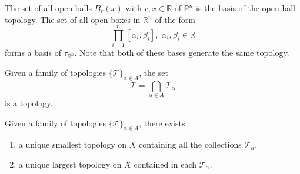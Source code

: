 \documentclass{article}
\begin{document}
      \begin{example}
        The set of all open balls $B_r (x)$ with $r, x \in \mathbb{R}$ of $\mathbb{R}^n$ is the basis of the open ball topology. The set of all open boxes in $\mathbb{R}^{n}$ of the form 
        \begin{equation}
          \prod_{i=1}^n [\alpha_i, \beta_i], \; \alpha_i, \beta_i \in \mathbb{R} 
        \end{equation}
        forms a basis of $\tau_{\mathbb{R}^{n}}$. Note that both of these bases generate the same topology. 
      \end{example} 

      \begin{theorem}
        Given a family of topologies $\{\mathscr{T}\}_{\alpha \in A}$, the set 
        \begin{equation}
          \mathscr{T} = \bigcap_{\alpha \in A} \mathscr{T}_\alpha
        \end{equation}
        is a topology. 
      \end{theorem}

      \begin{corollary}
        Given a family of topologies $\{\mathscr{T}\}_{\alpha \in A}$, there exists 
        \begin{enumerate}
          \item a unique smallest topology on $X$ containing all the collections $\mathscr{T}_\alpha$. 
          \item a unique largest topology on $X$ contained in each $\mathscr{T}_\alpha$. 
        \end{enumerate}
      \end{corollary} 
\end{document}
